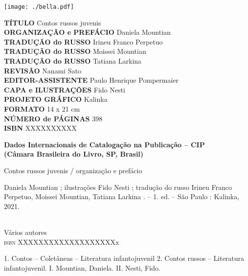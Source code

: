 \newcommand{\linha}[2]{\ifdef{#2}{\linhalayout{#1}{#2}}{}}

\begingroup\tiny
\parindent=0cm
\thispagestyle{empty}

\texttt{[image: ./bella.pdf]}

\textbf{TÍTULO} Contos russos juvenis\\
\textbf{ORGANIZAÇÃO e PREFÁCIO} Daniela Mountian\\
\textbf{TRADUÇÃO do RUSSO} Irineu Franco Perpetuo\\
\textbf{TRADUÇÃO do RUSSO} Moissei Mountian\\
\textbf{TRADUÇÃO do RUSSO} Tatiana Larkina\\
\textbf{REVISÃO} Nanami Sato\\
\textbf{EDITOR-ASSISTENTE} Paulo Henrique Pompermaier\\
\textbf{CAPA e ILUSTRAÇÕES} Fido Nesti\\
\textbf{PROJETO GRÁFICO} Kalinka\\
\textbf{FORMATO} 14 x 21 cm\\
\textbf{NÚMERO de PÁGINAS} 398\\
\textbf{ISBN} XXXXXXXXXX\\

\bigskip

\begin{flushleft}
\textbf{Dados Internacionais de Catalogação na Publicação -- CIP}\\
\textbf{(Câmara Brasileira do Livro, SP, Brasil)}\\
\hrulefill
\end{flushleft}
\hspace{5pt}Contos russos juvenis / organização e prefácio\\
\hspace{20pt}\parbox{185pt}{Daniela Mountian ; ilustrações Fido Nesti ; tradução do russo Irineu Franco Perpetuo, Moissei Mountian, Tatiana Larkina . -- 1. ed. -- São Paulo :
Kalinka, 2021.}\\[6pt]

\hspace{20pt}Vários autores\\
\hspace{20pt}\textsc{isbn} XXXXXXXXXXXXXXXXXXXx\\

\hspace{20pt}\parbox{185pt}{1. Contos -- Coletâneas -- Literatura infantojuvenil 2. Contos russos -- Literatura infantojuvenil. I. Mountian, Daniela. II. Nesti, Fido.}

